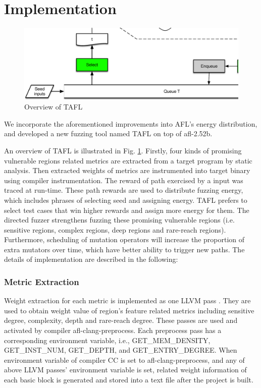 \section{Implementation}\label{impl}

\begin{figure}[tb]
\centering
\includegraphics[width=7.2in]{pic/TAFL.eps}
\caption{Overview of TAFL}
\label{table:tafl}
\end{figure}

We incorporate the aforementioned improvements into AFL's energy distribution, and developed a new fuzzing tool named TAFL on top of afl-2.52b. 

An overview of TAFL is illustrated in Fig. \ref{table:tafl}. Firstly, four kinds of promising vulnerable regions related metrics are extracted from a target program by static analysis. Then extracted weights of metrics are instrumented into target binary using compiler instrumentation. The reward of path exercised by a input was traced at run-time. These path rewards are used to distribute fuzzing energy, which includes phrases of selecting seed and assigning energy. TAFL prefers to select test cases that win higher rewards and assign more energy for them. The directed fuzzer strengthens fuzzing these promising vulnerable regions (i.e. sensitive regions, complex regions, deep regions and rare-reach regions). Furthermore, scheduling of mutation operators will increase the proportion of extra mutators over time, which have better ability to trigger new paths. The details of implementation are described in the following:

\subsubsection{Metric  Extraction}
Weight extraction for each metric is implemented as one LLVM pass \cite{pass}. They are used to obtain weight value of region's feature related metrics including sensitive degree, complexity, depth and rare-reach degree. These passes are used and activated by compiler afl-clang-preprocess. Each preprocess pass has a corresponding environment variable, i.e., GET\_MEM\_DENSITY, GET\_INST\_NUM, GET\_DEPTH, and GET\_ENTRY\_DEGREE. When environment variable of compiler CC is set to afl-clang-preprocess, and any of above LLVM passes' environment variable is set, related weight information of each basic block is generated and stored into a text file after the project is built.


